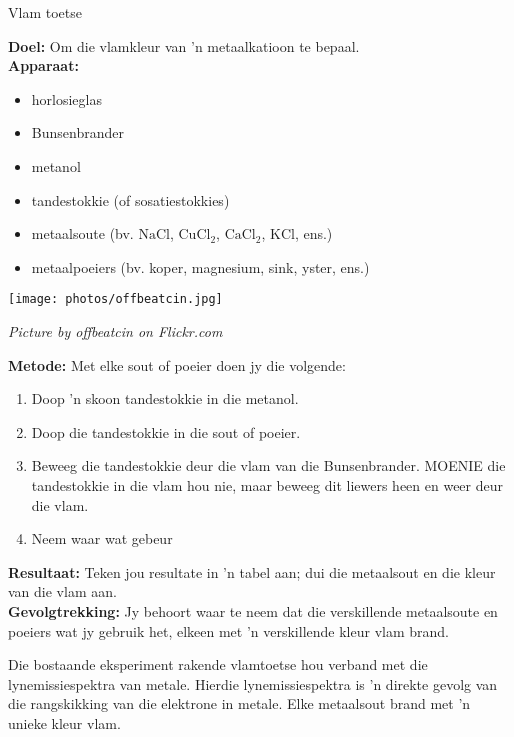 \nopagebreak
\begin{i_experiment}{Vlam toetse}{
\nopagebreak
\textbf{Doel:}\newline
Om die vlamkleur van 'n metaalkatioon te bepaal.\\
\textbf{Apparaat:}\newline
\begin{minipage}{.5\textwidth}
\begin{itemize}[noitemsep]
\item horlosieglas
\item Bunsenbrander
\item metanol
\item tandestokkie (of sosatiestokkies)
\item metaalsoute (bv. $\text{NaCl}$, ${\text{CuCl}}_{2}$, ${\text{CaCl}}_{2}$, $\text{KCl}$, ens.)
\item metaalpoeiers (bv. koper, magnesium, sink, yster, ens.)
\end{itemize}
\end{minipage}
\begin{minipage}{.5\textwidth}
\begin{center}
 \texttt{[image: photos/offbeatcin.jpg]}\par
\textit{Picture by offbeatcin on Flickr.com}
\end{center}
\end{minipage}
\textbf{Metode:}\newline
Met elke sout of poeier doen jy die volgende: 
\begin{enumerate}[noitemsep, label=\textbf{\arabic*}. ] 
\item Doop 'n skoon tandestokkie in die metanol.
\item Doop die tandestokkie in die sout of poeier.
\item Beweeg die tandestokkie deur die vlam van die Bunsenbrander. MOENIE die tandestokkie in die vlam hou nie,
maar beweeg dit liewers heen en weer deur die vlam.
\item Neem waar wat gebeur
\end{enumerate}
\textbf{Resultaat:}\newline
Teken jou resultate in 'n tabel aan; dui die metaalsout en die kleur van die vlam aan.
\\ 
\textbf{Gevolgtrekking:}\newline
Jy behoort waar te neem dat die verskillende metaalsoute en poeiers wat jy gebruik het, elkeen met 'n verskillende kleur vlam brand.}
\end{i_experiment}
Die bostaande eksperiment rakende vlamtoetse hou verband met die lynemissiespektra van metale. Hierdie lynemissiespektra is 'n direkte gevolg van die rangskikking van die elektrone in metale. Elke metaalsout brand met 'n unieke kleur vlam. \par 

